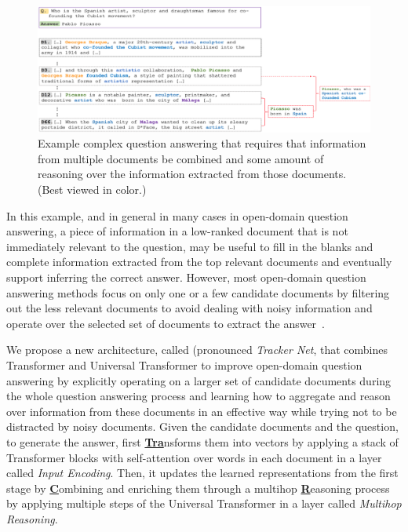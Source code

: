 \begin{figure}[!t]
 \centering
 \includegraphics[width=\textwidth]{04-part-03/chapter-06/figs_and_tables/fig_od_example.png}
 \caption{Example complex question answering that requires that information from multiple documents be combined and some amount of reasoning over the information extracted from those documents. (Best viewed in color.)}
 \label{fig:example}
\end{figure}

In this example, and in general in many cases in open-domain question answering, a piece of information in a low-ranked document that is not immediately relevant to the question, may be useful to fill in the blanks and complete information extracted from the top relevant documents and eventually support inferring the correct answer.
However, most open-domain question answering methods focus on only one or a few candidate documents by filtering out the less relevant documents to avoid dealing with noisy information and operate over the selected set of documents to extract the answer~\citep{wang2017r, wang2017evidence,lin2018denoising}. 

We propose a new architecture, called \tracrnet (pronounced \emph{Tracker Net}, that combines Transformer and  Universal Transformer to improve open-domain question answering by explicitly operating on a larger set of candidate documents during the whole question answering process and learning how to aggregate and reason over information from these documents in an effective way while trying not to be distracted by noisy documents. 
% 
Given the candidate documents and the question, to generate the answer, \tracrnet first \underline{\textbf{Tra}}nsforms them into vectors by applying a stack of  Transformer blocks with self-attention over words in each document in a layer called \emph{Input Encoding}. 
Then, it updates the learned representations from the first stage by \underline{\textbf{C}}ombining and enriching them through a multihop \underline{\textbf{R}}easoning process by applying multiple steps of the Universal Transformer in a layer called \emph{Multihop Reasoning}.  

